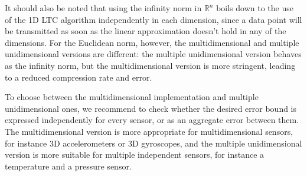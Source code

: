 It should also be noted that using the infinity norm in $\mathbb{R}^n$ 
boils down to the use of the 1D LTC algorithm independently in each 
dimension, since a data point will be transmitted as soon as the linear 
approximation doesn't hold in any of the dimensions. For the Euclidean 
norm, however, the multidimensional and multiple unidimensional 
versions are different: the multiple unidimensional version 
behaves as the infinity norm, but the multidimensional version is more 
stringent, leading to a reduced compression rate and error.

To choose between the multidimensional implementation and multiple 
unidimensional ones, we recommend to check whether the desired 
error bound is expressed independently for every sensor, or as an aggregate error between them.
The multidimensional version is
more appropriate for multidimensional sensors, for instance 3D 
accelerometers or 3D gyroscopes, and the multiple unidimensional 
version is more suitable for multiple independent sensors, for 
instance a temperature and a pressure sensor.
